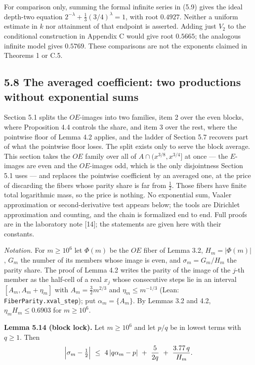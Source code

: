 \documentclass[11pt,a4paper]{article}
\begin{document}
For comparison only, summing the formal infinite series in (5.9) gives
the ideal depth-two equation \(2^{-\lambda}+\tfrac13(3/4)^\lambda=1\),
with root \(0.4927\). Neither a uniform estimate in \(k\) nor attainment
of that endpoint is asserted. Adding just \(V_2\) to the conditional
construction in Appendix C would give root \(0.5665\); the analogous
infinite model gives \(0.5769\). These comparisons are not the exponents
claimed in Theorems 1 or C.5.

\subsection{5.8 The averaged coefficient: two productions without
exponential
sums}\label{the-averaged-coefficient-two-productions-without-exponential-sums}

Section 5.1 splits the \(OE\)-images into two families, item 2 over the
even blocks, where Proposition 4.4 controls the share, and item 3 over
the rest, where the pointwise floor of Lemma 4.2 applies, and the ladder
of Section 5.7 recovers part of what the pointwise floor loses. The
split exists only to serve the block average. This section takes the
\(OE\) family over all of \(A\cap(x^{3/8},x^{3/4}]\) at once --- the
\(E\)-images are even and the \(OE\)-images odd, which is the only
disjointness Section 5.1 uses --- and replaces the pointwise coefficient
by an averaged one, at the price of discarding the fibers whose parity
share is far from \(\tfrac12\). Those fibers have finite total
logarithmic mass, so the price is nothing. No exponential sum, Vaaler
approximation or second-derivative test appears below; the tools are
Dirichlet approximation and counting, and the chain is formalized end to
end. Full proofs are in the laboratory note {[}14{]}; the statements are
given here with their constants.

\emph{Notation.} For \(m\ge10^6\) let \(\Phi(m)\) be the \(OE\) fiber of
Lemma 3.2, \(H_m=|\Phi(m)|\), \(G_m\) the number of its members whose
image is even, and \(\sigma_m=G_m/H_m\) the parity share. The proof of
Lemma 4.2 writes the parity of the image of the \(j\)-th member as the
half-cell of a real \(x_j\) whose consecutive steps lie in an interval
\([A_m,A_m+\eta_m]\) with \(A_m=\tfrac32m^{2/3}\) and
\(\eta_m\le m^{-1/3}\) (Lean:
\texttt{\nolinkurl{FiberParity.xval_step}}); put \(\alpha_m=\{A_m\}\).
By Lemmas 3.2 and 4.2, \(\eta_mH_m\le0.6903\) for \(m\ge10^6\).

\textbf{Lemma 5.14 (block lock).} Let \(m\ge10^6\) and let \(p/q\) be in
lowest terms with \(q\ge1\). Then \[
\Bigl|\sigma_m-\tfrac12\Bigr|\ \le\
4\,|q\alpha_m-p|\ +\ \frac{5}{2q}\ +\ \frac{3.77\,q}{H_m}.
\]
\end{document}

